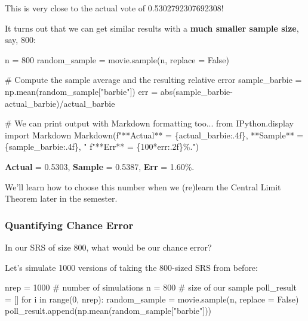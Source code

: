 \documentclass[
  letterpaper,
  DIV=11,
  numbers=noendperiod]{scrreprt}
\newenvironment{Shaded}{\begin{snugshade}}{\end{snugshade}}
\newcommand{\BuiltInTok}[1]{\textcolor[rgb]{0.00,0.23,0.31}{#1}}
\newcommand{\CommentTok}[1]{\textcolor[rgb]{0.37,0.37,0.37}{#1}}
\newcommand{\ControlFlowTok}[1]{\textcolor[rgb]{0.00,0.23,0.31}{#1}}
\newcommand{\DecValTok}[1]{\textcolor[rgb]{0.68,0.00,0.00}{#1}}
\newcommand{\ImportTok}[1]{\textcolor[rgb]{0.00,0.46,0.62}{#1}}
\newcommand{\KeywordTok}[1]{\textcolor[rgb]{0.00,0.23,0.31}{#1}}
\newcommand{\NormalTok}[1]{\textcolor[rgb]{0.00,0.23,0.31}{#1}}
\newcommand{\OperatorTok}[1]{\textcolor[rgb]{0.37,0.37,0.37}{#1}}
\newcommand{\SpecialCharTok}[1]{\textcolor[rgb]{0.37,0.37,0.37}{#1}}
\newcommand{\SpecialStringTok}[1]{\textcolor[rgb]{0.13,0.47,0.30}{#1}}
\newcommand{\StringTok}[1]{\textcolor[rgb]{0.13,0.47,0.30}{#1}}
\newcommand{\VariableTok}[1]{\textcolor[rgb]{0.07,0.07,0.07}{#1}}
\begin{document}
This is very close to the actual vote of 0.5302792307692308!

It turns out that we can get similar results with a \textbf{much smaller
sample size}, say, 800:

\begin{Shaded}
\begin{Highlighting}[]
\NormalTok{n }\OperatorTok{=} \DecValTok{800}
\NormalTok{random\_sample }\OperatorTok{=}\NormalTok{ movie.sample(n, replace }\OperatorTok{=} \VariableTok{False}\NormalTok{)}

\CommentTok{\# Compute the sample average and the resulting relative error}
\NormalTok{sample\_barbie }\OperatorTok{=}\NormalTok{ np.mean(random\_sample[}\StringTok{"barbie"}\NormalTok{])}
\NormalTok{err }\OperatorTok{=} \BuiltInTok{abs}\NormalTok{(sample\_barbie}\OperatorTok{{-}}\NormalTok{actual\_barbie)}\OperatorTok{/}\NormalTok{actual\_barbie}

\CommentTok{\# We can print output with Markdown formatting too...}
\ImportTok{from}\NormalTok{ IPython.display }\ImportTok{import}\NormalTok{ Markdown}
\NormalTok{Markdown(}\SpecialStringTok{f"**Actual** = }\SpecialCharTok{\{}\NormalTok{actual\_barbie}\SpecialCharTok{:.4f\}}\SpecialStringTok{, **Sample** = }\SpecialCharTok{\{}\NormalTok{sample\_barbie}\SpecialCharTok{:.4f\}}\SpecialStringTok{, "}
         \SpecialStringTok{f"**Err** = }\SpecialCharTok{\{}\DecValTok{100}\OperatorTok{*}\NormalTok{err}\SpecialCharTok{:.2f\}}\SpecialStringTok{\%."}\NormalTok{)}
\end{Highlighting}
\end{Shaded}

\textbf{Actual} = 0.5303, \textbf{Sample} = 0.5387, \textbf{Err} =
1.60\%.

We'll learn how to choose this number when we (re)learn the Central
Limit Theorem later in the semester.

\subsubsection{Quantifying Chance Error}\label{quantifying-chance-error}

In our SRS of size 800, what would be our chance error?

Let's simulate 1000 versions of taking the 800-sized SRS from before:

\begin{Shaded}
\begin{Highlighting}[]
\NormalTok{nrep }\OperatorTok{=} \DecValTok{1000}   \CommentTok{\# number of simulations}
\NormalTok{n }\OperatorTok{=} \DecValTok{800}       \CommentTok{\# size of our sample}
\NormalTok{poll\_result }\OperatorTok{=}\NormalTok{ []}
\ControlFlowTok{for}\NormalTok{ i }\KeywordTok{in} \BuiltInTok{range}\NormalTok{(}\DecValTok{0}\NormalTok{, nrep):}
\NormalTok{    random\_sample }\OperatorTok{=}\NormalTok{ movie.sample(n, replace }\OperatorTok{=} \VariableTok{False}\NormalTok{)}
\NormalTok{    poll\_result.append(np.mean(random\_sample[}\StringTok{"barbie"}\NormalTok{]))}
\end{Highlighting}
\end{Shaded}
\end{document}
